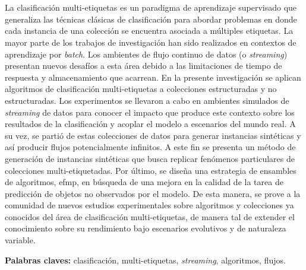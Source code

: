 \chapter*{\runtitulo}

\noindent La clasificación multi-etiquetas es un paradigma de aprendizaje
supervisado que generaliza las técnicas clásicas de clasificación para abordar
problemas en donde cada instancia de una colección se encuentra asociada a
múltiples etiquetas. La mayor parte de los trabajos de investigación han sido
realizados en contextos de aprendizaje por \textit{batch}. Los ambientes de
flujo continuo de datos  (o \textit{streaming}) presentan nuevos desafíos a esta
área debido a las limitaciones de tiempo de respuesta y almacenamiento que
acarrean. En la presente investigación se aplican algoritmos de clasificación
multi-etiquetas a colecciones estructuradas y no estructuradas. Los experimentos
se llevaron a cabo en ambientes simulados de \textit{streaming} de datos para
conocer el impacto que produce este contexto sobre los resultados de la
clasificación y acoplar el modelo a escenarios del mundo real. A su vez, se
partió de estas colecciones de datos para generar instancias sintéticas y así
producir flujos potencialmente infinitos. A este fin se presenta un método de
generación de instancias sintéticas que busca replicar fenómenos particulares de
colecciones multi-etiquetadas. Por último, se diseña una estrategia de ensambles
de algoritmos, \acrshort{efmp}, en búsqueda de una mejora en la calidad de la
tarea de predicción de objetos no observados por el modelo. De esta manera, se
prove a la comunidad de nuevos estudios experimentales sobre algoritmos y
colecciones ya conocidos del área de clasificación multi-etiquetas, de manera
tal de extender el conocimiento sobre su rendimiento bajo escenarios evolutivos
y de naturaleza variable.

\bigskip

\noindent\textbf{Palabras claves:} clasificación, multi-etiquetas, \textit{streaming}, algoritmos, flujos.
